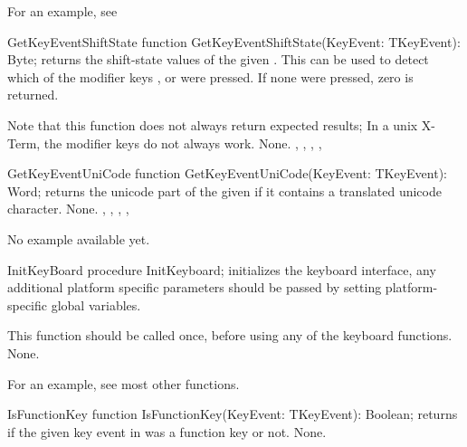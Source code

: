 For an example, see 

\begin{function}{GetKeyEventShiftState}
\Declaration
function GetKeyEventShiftState(KeyEvent: TKeyEvent): Byte;
\Description
{} returns the shift-state values of 
the given . This can be used to detect which of the modifier
keys ,  or  were pressed. If none were
pressed, zero is returned.

Note that this function does not always return expected results;
In a unix X-Term, the modifier keys do not always work.
\Errors
None.
\SeeAlso
{},
, 
,
,
\end{function}


\begin{function}{GetKeyEventUniCode}
\Declaration
function GetKeyEventUniCode(KeyEvent: TKeyEvent): Word;
\Description
{} returns the unicode part of the 
given  if it contains a translated unicode 
character.
\Errors
None.
\SeeAlso
{},
, 
,
,
\end{function}

No example available yet.

\begin{procedure}{InitKeyBoard}
\Declaration
procedure InitKeyboard;
\Description
{} initializes the keyboard interface, any 
additional platform specific parameters should be passed by 
setting platform-specific global variables.

This function should be called once, before using any of the
keyboard functions.
\Errors
None.
\SeeAlso
{}
\end{procedure}

For an example, see most other functions.

\begin{function}{IsFunctionKey}
\Declaration
function IsFunctionKey(KeyEvent: TKeyEvent): Boolean;
\Description
{} returns  if the given key event
in  was a function key or not.
\Errors
None.
\SeeAlso
{}
\end{function}


